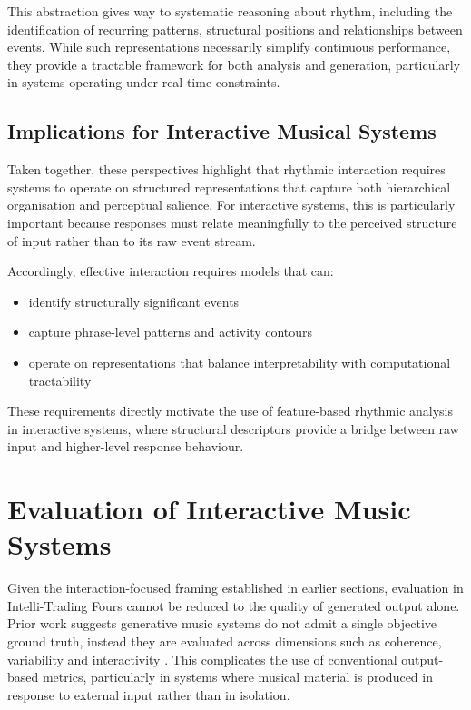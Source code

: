 This abstraction gives way to systematic reasoning about rhythm,
including the identification of recurring patterns, structural positions
and relationships between events. While such representations necessarily
simplify continuous performance, they provide a tractable framework for
both analysis and generation, particularly in systems operating under
real-time constraints.

\subsection{Implications for Interactive Musical Systems}\label{implications-for-interactive-musical-systems}

Taken together, these perspectives highlight that rhythmic interaction
requires systems to operate on structured representations that capture
both hierarchical organisation and perceptual salience. For interactive
systems, this is particularly important because responses must relate
meaningfully to the perceived structure of input rather than to its raw
event stream.

Accordingly, effective interaction requires models that can:

\begin{itemize}
\item
  identify structurally significant events
\item
  capture phrase-level patterns and activity contours
\item
  operate on representations that balance interpretability with
  computational tractability
\end{itemize}

These requirements directly motivate the use of feature-based rhythmic
analysis in interactive systems, where structural descriptors provide a
bridge between raw input and higher-level response behaviour.

\section{Evaluation of Interactive Music Systems}\label{evaluation-of-interactive-music-systems}

Given the interaction-focused framing established in earlier sections,
evaluation in Intelli-Trading Fours cannot be reduced to the quality of
generated output alone. Prior work suggests generative music systems do
not admit a single objective ground truth, instead they are evaluated
across dimensions such as coherence, variability and interactivity
\citep{briot2020deep}. This complicates the use of
conventional output-based metrics, particularly in systems where musical
material is produced in response to external input rather than in
isolation.

